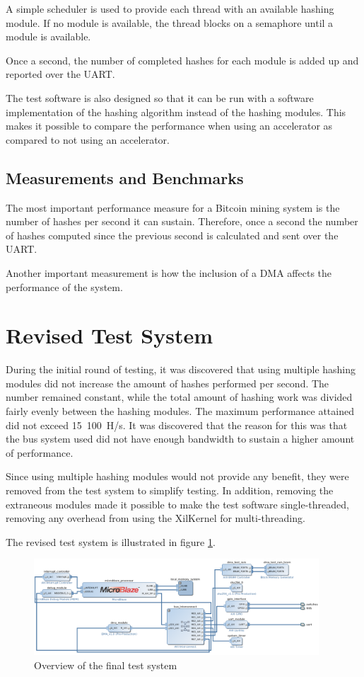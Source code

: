 A simple scheduler is used to provide each thread with an available hashing module.
If no module is available, the thread blocks on a semaphore until a module is available.

Once a second, the number of completed hashes for each module is added up and
reported over the UART.

The test software is also designed so that it can be run with a software implementation
of the hashing algorithm instead of the hashing modules. This makes it possible
to compare the performance when using an accelerator as compared to not using
an accelerator.

\subsection{Measurements and Benchmarks}
The most important performance measure for a Bitcoin mining system is the number
of hashes per second it can sustain. Therefore, once a second the number of hashes
computed since the previous second is calculated and sent over the UART.

Another important measurement is how the inclusion of a DMA affects the performance
of the system.

\section{Revised Test System}

During the initial round of testing, it was discovered that using multiple hashing
modules did not increase the amount of hashes performed per second. The number remained
constant, while the total amount of hashing work was divided fairly evenly between
the hashing modules. The maximum performance attained did not exceed 15~100~H/s.
It was discovered that the reason for this was that the bus system used did not have
enough bandwidth to sustain a higher amount of performance.

Since using multiple hashing modules would not provide any benefit, they were removed
from the test system to simplify testing. In addition, removing the extraneous modules
made it possible to make the test software single-threaded, removing any overhead from
using the XilKernel for multi-threading.

The revised test system is illustrated in figure \ref{fig:testsystem-vivado-final}.

\begin{figure}[ht]
	\includegraphics[width=0.95\textwidth]{Figures/testsystem-vivado-final.png}
	\caption{Overview of the final test system}
	\label{fig:testsystem-vivado-final}
\end{figure}

